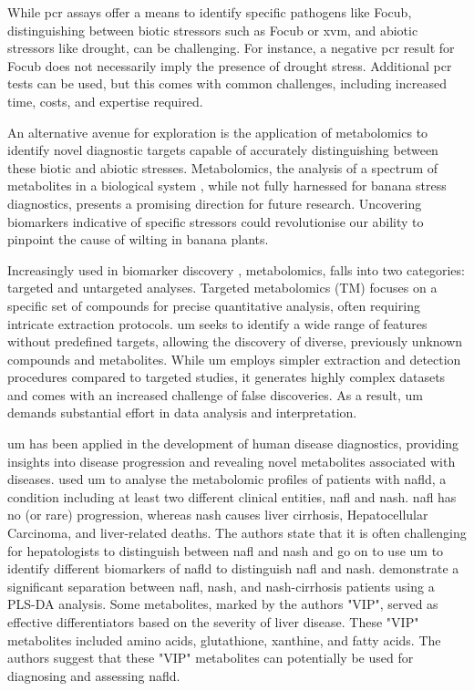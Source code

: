 While \ac{pcr} assays offer a means to identify specific pathogens like \ac{Focub}, distinguishing between biotic stressors such as \ac{Focub} or \ac{xvm}, and abiotic stressors like drought, can be challenging. For instance, a negative \ac{pcr} result for \ac{Focub} does not necessarily imply the presence of drought stress. Additional \ac{pcr} tests can be used, but this comes with common challenges, including increased time, costs, and expertise required.

An alternative avenue for exploration is the application of metabolomics to identify novel diagnostic targets capable of accurately distinguishing between these biotic and abiotic stresses. Metabolomics, the analysis of a spectrum of metabolites in a biological system \parencite{Klassen2017}, while not fully harnessed for banana stress diagnostics, presents a promising direction for future research. Uncovering biomarkers indicative of specific stressors could revolutionise our ability to pinpoint the cause of wilting in banana plants.

Increasingly used in biomarker discovery \parencite{Li2016, Dang2018, Chen2023}, metabolomics, falls into two categories: targeted and untargeted analyses. Targeted metabolomics (TM) focuses on a specific set of compounds for precise quantitative analysis, often requiring intricate extraction protocols. \acf{um} seeks to identify a wide range of features without predefined targets, allowing the discovery of diverse, previously unknown compounds and metabolites. While \ac{um} employs simpler extraction and detection procedures compared to targeted studies, it generates highly complex datasets and comes with an increased challenge of false discoveries. As a result, \ac{um} demands substantial effort in data analysis and interpretation.

\ac{um} has been applied in the development of human disease diagnostics, providing insights into disease progression and revealing novel metabolites associated with diseases. \textcite{Masarone2021} used \ac{um} to analyse the metabolomic profiles of patients with \ac{nafld}, a condition including at least two different clinical entities, \ac{nafl} and \ac{nash}. \ac{nafl} has no (or rare) progression, whereas \ac{nash} causes liver cirrhosis, Hepatocellular Carcinoma, and liver-related deaths. The authors state that it is often challenging for hepatologists to distinguish between \ac{nafl} and \ac{nash} and go on to use \ac{um} to identify different biomarkers of \ac{nafld} to distinguish \ac{nafl} and \ac{nash}. \textcite{Masarone2021} demonstrate a significant separation between \ac{nafl}, \ac{nash}, and \ac{nash}-cirrhosis patients using a PLS-DA analysis. Some metabolites, marked by the authors "VIP", served as effective differentiators based on the severity of liver disease. These "VIP" metabolites included amino acids, glutathione, xanthine, and fatty acids. The authors suggest that these "VIP" metabolites can potentially be used for diagnosing and assessing \ac{nafld}.


